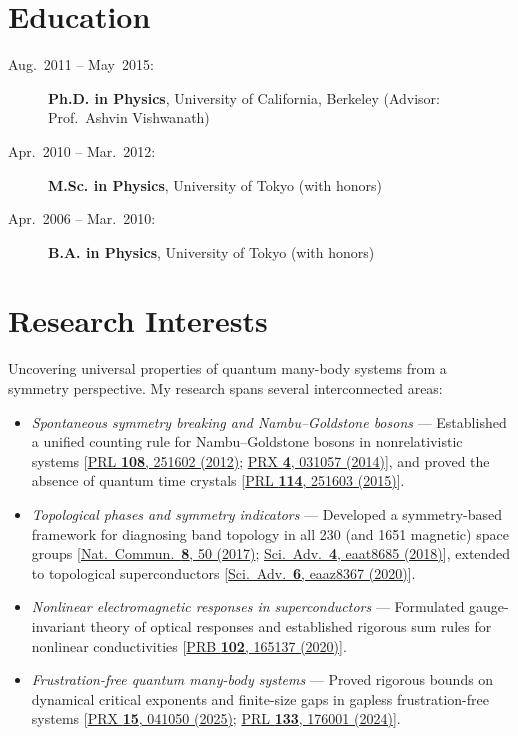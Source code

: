 \documentclass[letterpaper,11pt]{article}
\begin{document}
\section*{Education}
\begin{description}
    \item[Aug.~2011 -- May~2015:] \textbf{Ph.D. in Physics}, University of California, Berkeley (Advisor: Prof.~Ashvin Vishwanath)
    \item[Apr.~2010 -- Mar.~2012:] \textbf{M.Sc. in Physics}, University of Tokyo (with honors)
    \item[Apr.~2006 -- Mar.~2010:] \textbf{B.A. in Physics}, University of Tokyo (with honors)
\end{description}

\section*{Research Interests}
Uncovering universal properties of quantum many-body systems from a symmetry perspective. My research spans several interconnected areas:
\begin{itemize}[noitemsep, topsep=3pt]
    \item \emph{Spontaneous symmetry breaking and Nambu--Goldstone bosons} ---
    Established a unified counting rule for Nambu--Goldstone bosons in nonrelativistic systems [\href{https://doi.org/10.1103/PhysRevLett.108.251602}{PRL {\bf 108}, 251602 (2012)}; \href{https://doi.org/10.1103/PhysRevX.4.031057}{PRX {\bf 4}, 031057 (2014)}], and proved the absence of quantum time crystals [\href{https://doi.org/10.1103/PhysRevLett.114.251603}{PRL {\bf 114}, 251603 (2015)}].

    \item \emph{Topological phases and symmetry indicators} ---
    Developed a symmetry-based framework for diagnosing band topology in all 230 (and 1651 magnetic) space groups [\href{https://doi.org/10.1038/s41467-017-00133-2}{Nat.~Commun.~{\bf 8}, 50 (2017)}; \href{https://doi.org/10.1126/sciadv.aat8685}{Sci.~Adv.~{\bf 4}, eaat8685 (2018)}], extended to topological superconductors [\href{https://doi.org/10.1126/sciadv.aaz8367}{Sci.~Adv.~{\bf 6}, eaaz8367 (2020)}].

    \item \emph{Nonlinear electromagnetic responses in superconductors} ---
    Formulated gauge-invariant theory of optical responses and established rigorous sum rules for nonlinear conductivities [\href{https://doi.org/10.1103/PhysRevB.102.165137}{PRB {\bf 102}, 165137 (2020)}].

    \item \emph{Frustration-free quantum many-body systems} ---
    Proved rigorous bounds on dynamical critical exponents and finite-size gaps in gapless frustration-free systems [\href{https://doi.org/10.1103/d4c4-5p2r}{PRX {\bf 15}, 041050 (2025)}; \href{https://doi.org/10.1103/PhysRevLett.133.176001}{PRL {\bf 133}, 176001 (2024)}].
\end{itemize}
\end{document}
